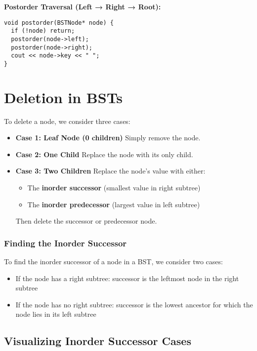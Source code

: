 \documentclass{article}
\begin{document}
\textbf{Postorder Traversal (Left → Right → Root):}
\begin{lstlisting}[style=cppstyle]
void postorder(BSTNode* node) {
  if (!node) return;
  postorder(node->left);
  postorder(node->right);
  cout << node->key << " ";
}
\end{lstlisting}

\section{Deletion in BSTs}

To delete a node, we consider three cases:

\begin{itemize}
  \item \textbf{Case 1: Leaf Node (0 children)}  
    Simply remove the node.
  \item \textbf{Case 2: One Child}  
    Replace the node with its only child.
  \item \textbf{Case 3: Two Children}  
    Replace the node’s value with either:
    \begin{itemize}
      \item The \textbf{inorder successor} (smallest value in right subtree)
      \item The \textbf{inorder predecessor} (largest value in left subtree)
    \end{itemize}
    Then delete the successor or predecessor node.
\end{itemize}

\subsubsection*{Finding the Inorder Successor}

To find the inorder successor of a node in a BST, we consider two cases:

\begin{itemize}
  \item If the node has a right subtree: successor is the leftmost node in the right subtree
  \item If the node has no right subtree: successor is the lowest ancestor for which the node lies in its left subtree
\end{itemize}

\subsection{Visualizing Inorder Successor Cases}
\end{document}
